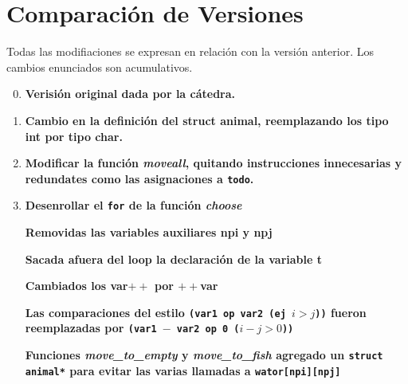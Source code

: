 \documentclass[a4paper,10pt]{article}
\begin{document}
\newpage

\section{Comparaci\'on de Versiones}

Todas las modifiaciones se expresan en relaci\'on con la versi\'on anterior. Los cambios enunciados son acumulativos.

\begin{enumerate}
\setcounter{enumi}{-1}

 \item \textbf {Verisi\'on original dada por la c\'atedra.}
 
 \item \textbf {Cambio en la definici\'on del struct animal, reemplazando los tipo int por tipo char.}
 
 \item \textbf {Modificar la funci\'on \textit{moveall}, quitando instrucciones innecesarias y redundates como las asignaciones a \texttt{todo}.}
 
 \item \textbf {Desenrollar el \texttt{for} de la funci\'on \textit{choose}} 
	
	\textbf {Removidas las variables auxiliares npi y npj}
	
	\textbf {Sacada afuera del loop la declaraci\'on de la variable t}
	
	\textbf {Cambiados los var$++$ por $++$var}
	
	\textbf {Las comparaciones del estilo \texttt{(var1 op var2 (ej $i > j$))} fueron reemplazadas por \texttt{(var1 $-$ var2 op 0 ($i - j > 0$))}}
	
	\textbf {Funciones \textit{move\_to\_empty} y \textit{move\_to\_fish} agregado un \texttt{struct animal*} para evitar las varias llamadas a \texttt{wator[npi][npj]}}
		

\end{enumerate}
\end{document}
